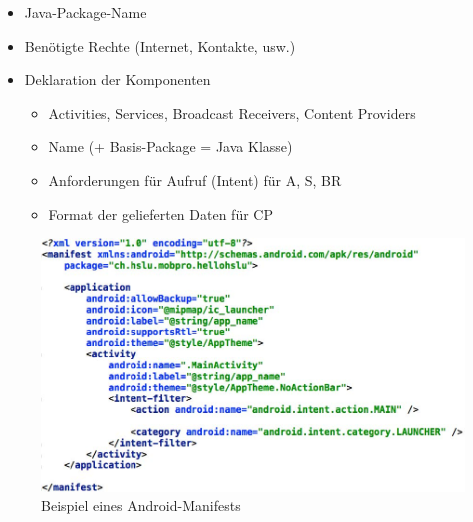 \documentclass[a4paper]{article}
\begin{document}
\begin{itemize}
	\item Java-Package-Name
	\item Benötigte Rechte (Internet, Kontakte, usw.)
	\item Deklaration der Komponenten
	\begin{itemize}
		\item Activities, Services, Broadcast Receivers, Content Providers
		\item Name (+ Basis-Package = Java Klasse)
		\item Anforderungen für Aufruf (Intent) für A, S, BR
		\item Format der gelieferten Daten für CP
	\end{itemize}
\end{itemize}
\begin{figure}[htb!]
	\centering
	\includegraphics[width=12cm]{img/manifestxml.jpg}
	\caption{Beispiel eines Android-Manifests}
	\label{fig:manifestxml}
\end{figure}
\end{document}
